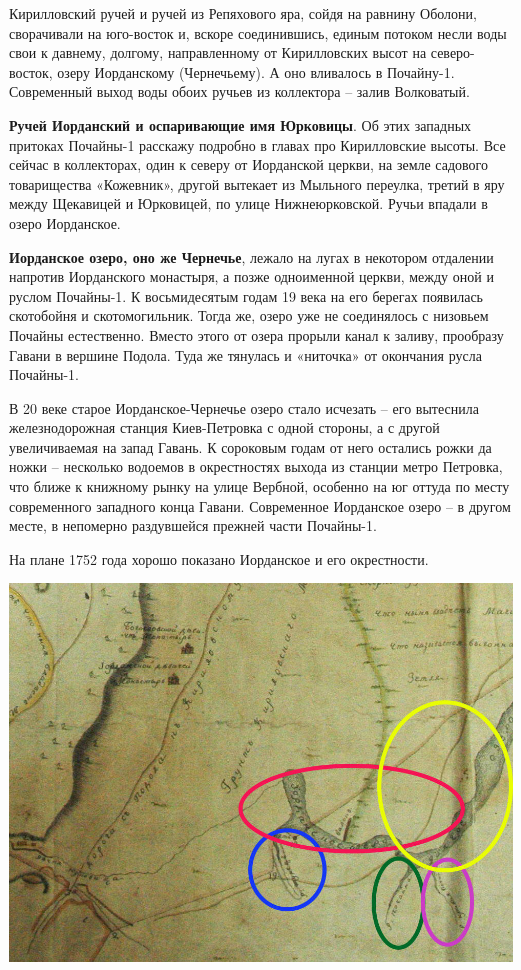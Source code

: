 Кирилловский ручей и ручей из Репяхового яра, сойдя на равнину Оболони, сворачивали на юго-восток и, вскоре соединившись, единым потоком несли воды свои к давнему, долгому, направленному от Кирилловских высот на северо-восток, озеру Иорданскому (Чернечьему). А оно вливалось в Почайну-1. Современный выход воды обоих ручьев из коллектора – залив Волковатый.
 
\textbf{Ручей Иорданский и оспаривающие имя Юрковицы}. Об этих западных притоках Почайны-1 расскажу подробно в главах про Кирилловские высоты. Все сейчас в коллекторах, один к северу от Иорданской церкви, на земле садового товарищества «Кожевник», другой вытекает из Мыльного переулка, третий в яру между Щекавицей и Юрковицей, по улице Нижнеюрковской. Ручьи впадали в озеро Иорданское.

\textbf{Иорданское озеро, оно же Чернечье}, лежало на лугах в некотором отдалении напротив Иорданского монастыря, а позже одноименной церкви, между оной и руслом Почайны-1. К восьмидесятым годам 19 века на его берегах появилась скотобойня и скотомогильник. Тогда же, озеро уже не соединялось с низовьем Почайны естественно. Вместо этого от озера прорыли канал к заливу, прообразу Гавани в вершине Подола. Туда же тянулась и «ниточка» от окончания русла Почайны-1.

В 20 веке старое Иорданское-Чернечье озеро стало исчезать – его вытеснила железнодорожная станция Киев-Петровка с одной стороны, а с другой увеличиваемая на запад Гавань. К сороковым годам от него остались рожки да ножки – несколько водоемов в окрестностях выхода из станции метро Петровка, что ближе к книжному рынку на улице Вербной, особенно на юг оттуда по месту современного западного конца Гавани. Современное Иорданское озеро – в другом месте, в непомерно раздувшейся прежней части Почайны-1.

На плане 1752 года хорошо показано Иорданское и его окрестности.

\begin{center}
\includegraphics[width=\linewidth]{chast-colebanie-osnov/pochayna/1752-chern.jpg}
\end{center}

